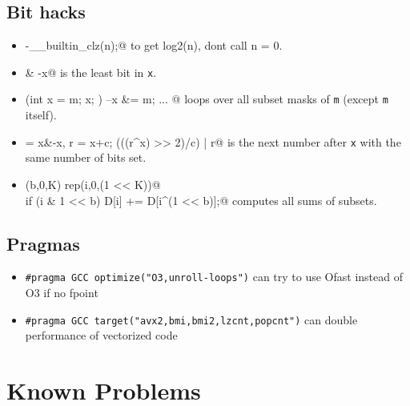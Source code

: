 	\subsection{Bit hacks}
		\begin{itemize}
			\item {}-__builtin_clz(n);@ to get log2(n), dont call n = 0.
			\item \verb@x & -x@ is the least bit in \texttt{x}.
			\item \verb@for (int x = m; x; ) { --x &= m; ... }@ loops over all subset masks of \texttt{m} (except \texttt{m} itself).
			\item \verb@c = x&-x, r = x+c; (((r^x) >> 2)/c) | r@ is the next number after \texttt{x} with the same number of bits set.
			\item \verb@rep(b,0,K) rep(i,0,(1 << K))@ \\ \verb@  if (i & 1 << b) D[i] += D[i^(1 << b)];@ computes all sums of subsets.
		\end{itemize}
	\subsection{Pragmas}
		\begin{itemize}
			\item \lstinline{#pragma GCC optimize("O3,unroll-loops")} can try to use Ofast instead of O3 if no fpoint
			\item \lstinline{#pragma GCC target("avx2,bmi,bmi2,lzcnt,popcnt")} can double performance of vectorized code
		\end{itemize}

\section{Known Problems}

